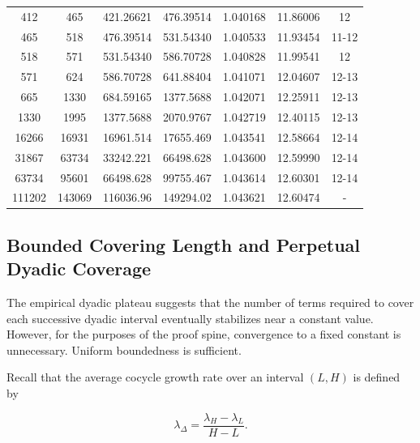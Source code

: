 \documentclass[12pt, oneside]{article}
\numberwithin{equation}{section}
\theoremstyle{definition}
\theoremstyle{plain}
\theoremstyle{remark}
\begin{document}
\begin{table}[h]
\begin{tabular}{
S[table-format=6.0]
S[table-format=6.0]
S[table-format=6.6]
S[table-format=6.6]
S[table-format=1.6]
S[table-format=2.5]
c
}
 412 &   465 & 421.26621 & 476.39514 & 1.040168 & 11.86006 & 12 \\
 465 &   518 & 476.39514 & 531.54340 & 1.040533 & 11.93454 & 11-12 \\
 518 &   571 & 531.54340 & 586.70728 & 1.040828 & 11.99541 & 12 \\
 571 &   624 & 586.70728 & 641.88404 & 1.041071 & 12.04607 & 12-13 \\
\hline
 665 &  1330 &  684.59165 & 1377.5688 & 1.042071 & 12.25911 & 12-13 \\
1330 &  1995 & 1377.5688  & 2070.9767 & 1.042719 & 12.40115 & 12-13 \\
16266 & 16931 & 16961.514 & 17655.469 & 1.043541 & 12.58664 & 12-14 \\
\hline
 31867 &  63734 &  33242.221 &  66498.628 & 1.043600 & 12.59990 & 12-14 \\
 63734 &  95601 &  66498.628 &  99755.467 & 1.043614 & 12.60301 & 12-14 \\
111202 & 143069 & 116036.96  & 149294.02  & 1.043621 & 12.60474 & - \\

\hline
\end{tabular}
\end{table}

\subsection{Bounded Covering Length and Perpetual Dyadic Coverage}
\label{subsec:bounded-covering-length}

The empirical dyadic plateau suggests that the number of terms required to
cover each successive dyadic interval eventually stabilizes near a constant
value. However, for the purposes of the proof spine, convergence to a fixed
constant is unnecessary. Uniform boundedness is sufficient.

Recall that the average cocycle growth rate over an interval $(L,H)$ is defined by

\[
\lambda_{\Delta} = \frac{\lambda_H - \lambda_L}{H-L}.
\]
\end{document}

